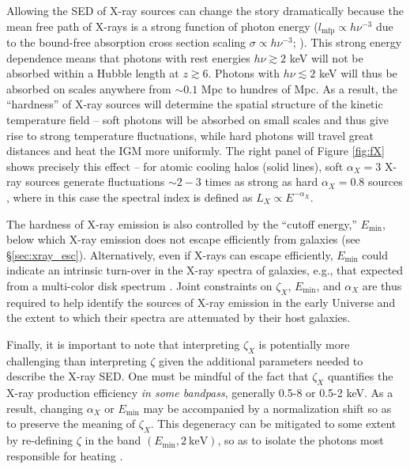 Allowing the SED of X-ray sources can change the story dramatically because the mean free path of X-rays is a strong function of photon energy ($l_{\mathrm{mfp}} \propto h\nu^{-3}$ due to the bound-free absorption cross section scaling $\sigma \propto h\nu^{-3}$; \cite{Verner1996}). This strong energy dependence means that photons with rest energies $h\nu \gtrsim 2$ keV will not be absorbed within a Hubble length at $z \gtrsim 6$. Photons with $h\nu \lesssim 2$ keV will thus be absorbed on scales anywhere from $\sim 0.1$ Mpc to hundres of Mpc. As a result, the ``hardness'' of X-ray sources will determine the spatial structure of the kinetic temperature field -- soft photons will be absorbed on small scales and thus give rise to strong temperature fluctuations, while hard photons will travel great distances and heat the IGM more uniformly. The right panel of Figure \ref{fig:fX} shows precisely this effect -- for atomic cooling halos (solid lines), soft $\alpha_X = 3$ X-ray sources generate fluctuations $\sim 2-3$ times as strong as hard $\alpha_X=0.8$ sources \cite{Pacucci2014}, where in this case the spectral index is defined as $L_X \propto E^{-\alpha_X}$.

The hardness of X-ray emission is also controlled by the ``cutoff energy,'' $E_{\min}$, below which X-ray emission does not escape efficiently from galaxies (see \S\ref{sec:xray_esc}). Alternatively, even if X-rays can escape efficiently, $E_{\min}$ could indicate an intrinsic turn-over in the X-ray spectra of galaxies, e.g., that expected from a multi-color disk spectrum \cite{Mitsuda1984}. Joint constraints on $\zeta_X$, $E_{\min}$, and $\alpha_X$ are thus required to help identify the sources of X-ray emission in the early Universe and the extent to which their spectra are attenuated by their host galaxies.

Finally, it is important to note that interpreting $\zeta_X$ is potentially more challenging than interpreting $\zeta$ given the additional parameters needed to describe the X-ray SED. One must be mindful of the fact that $\zeta_X$ quantifies the X-ray production efficiency \textit{in some bandpass}, generally 0.5-8 or 0.5-2 keV. As a result, changing $\alpha_X$ or $E_{\min}$ may be accompanied by a normalization shift so as to preserve the meaning of $\zeta_X$. This degeneracy can be mitigated to some extent by re-defining $\zeta$ in the band $(E_{\min}, 2 \ \mathrm{keV})$, so as to isolate the photons most responsible for heating \cite{Greig2017}.

